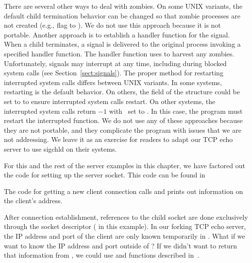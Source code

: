 There are several other ways to deal with zombies.  On some UNIX
variants, the default child termination behavior can be changed so
that zombie processes are not created (e.g., 
 flag to
).  We do not use
this approach because it is not portable.  Another approach is to
establish a handler function for the  signal.
When
a child terminates, a  signal is delivered
to the
original process invoking a specified handler function.  The
handler function uses  to harvest any
zombies.  Unfortunately, signals may interrupt at any time, including
during blocked system calls
(see Section~\ref{sect:signals}).  The proper method for restarting
interrupted
system calls differs between UNIX variants.  In some systems,
restarting is the default behavior.  On others, the
field of the  structure could be set to
 to ensure interrupted system calls
restart.
On other systems, the interrupted system calls return $-1$
with \ set to .  In this case, the
program must
restart the interrupted function.  We do not use any of these approaches
because they are not portable, and they complicate the program with
issues that we are not addressing.  We leave it as an exercise for
readers to adapt our TCP echo server to use sigchld on their systems.

For this and the rest of the server examples
in this chapter, we have factored out the code for setting up the server
socket.  This code can be found in  %


\noindent
The code for getting a new client connection calls
 and prints out information on the client's address.


After connection establishment, references to the child socket are
done exclusively through the socket descriptor ( in this
example).  In our forking TCP echo server, the IP address and
port of the client are only known temporarily in
.  What if we want to know the IP address and
port outside of ?  If we didn't want to
return that information from , we could
use  and  functions
described in~.

